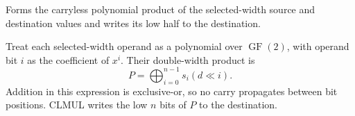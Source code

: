 Forms the carryless polynomial product of the selected-width source and destination values and writes its low half to the destination.

Treat each selected-width operand as a polynomial over \(\operatorname{GF}(2)\), with operand bit \(i\) as the coefficient of \(x^i\). Their double-width product is
\[
  P = \bigoplus_{i=0}^{n-1} s_i (d \ll i) .
\]
Addition in this expression is exclusive-or, so no carry propagates between bit positions. CLMUL writes the low \(n\) bits of \(P\) to the destination.
